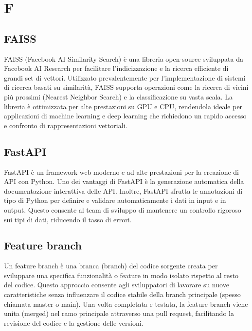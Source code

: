\section{F}

\vspace{2em}
\subsection*{FAISS}
FAISS (Facebook AI Similarity Search) è una libreria open-source sviluppata da Facebook AI Research per facilitare l'indicizzazione e la ricerca efficiente di grandi set di vettori. Utilizzato prevalentemente per l'implementazione di sistemi di ricerca basati su similarità, FAISS supporta operazioni come la ricerca di vicini più prossimi (Nearest Neighbor Search) e la classificazione su vasta scala. La libreria è ottimizzata per alte prestazioni su GPU e CPU, rendendola ideale per applicazioni di machine learning e deep learning che richiedono un rapido accesso e confronto di rappresentazioni vettoriali.

\vspace{2em}
\subsection*{FastAPI}
FastAPI è un framework web moderno e ad alte prestazioni per la creazione di API con Python. Uno dei vantaggi di FastAPI è la generazione automatica della documentazione interattiva delle API. Inoltre, FastAPI sfrutta le annotazioni di tipo di Python per definire e validare automaticamente i dati in input e in output. Questo consente al team di sviluppo di mantenere un controllo rigoroso sui tipi di dati, riducendo il tasso di errori.

\vspace{2em}
\subsection*{Feature branch}
Un feature branch è una branca (branch) del codice sorgente creata per sviluppare una specifica funzionalità o feature in modo isolato rispetto al resto del codice. Questo approccio consente agli sviluppatori di lavorare su nuove caratteristiche senza influenzare il codice stabile della branch principale (spesso chiamata master o main). Una volta completata e testata, la feature branch viene unita (merged) nel ramo principale attraverso una pull request, facilitando la revisione del codice e la gestione delle versioni.

